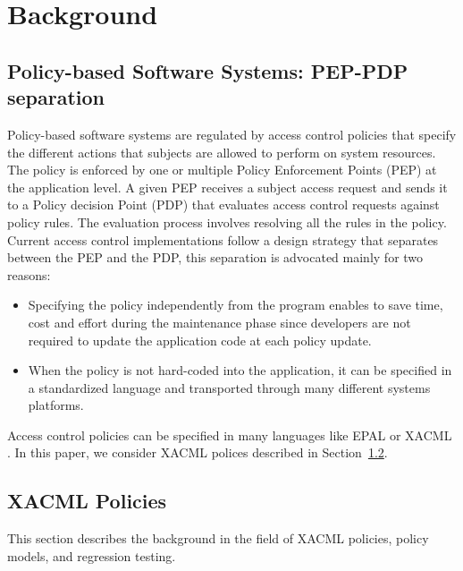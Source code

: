 
  
\section{Background}
\label{sec:background}
\subsection{Policy-based Software Systems: PEP-PDP separation}
Policy-based software systems are regulated by access control policies that specify the different actions that subjects are allowed to perform on system resources. 
The policy is enforced by one or multiple Policy Enforcement Points (PEP) at the application level. A given PEP receives a subject access request and 
sends it to a Policy decision Point (PDP) that evaluates access control requests against policy rules. The evaluation process involves resolving all the rules in the policy. 
Current access control implementations follow a design strategy that separates between the PEP and the PDP, this separation is advocated mainly for two reasons:
\begin{itemize}
\item Specifying the policy independently from the program enables to save time, cost and effort during the maintenance phase since developers are not required 
to update the application code at each policy update.
\item When the policy is not hard-coded into the application, it can be specified in a standardized language and transported through many different systems platforms.
\end{itemize}
Access control policies can be specified in many languages like EPAL \cite{epal} or XACML \cite {oasis05:xacml}. 
In this paper, we consider XACML polices described in Section~\ref{sec:xacmlpolicies}.


\subsection{XACML Policies} \label{sec:xacmlpolicies}
This section describes the background in the field of XACML policies, policy models, and regression testing.


